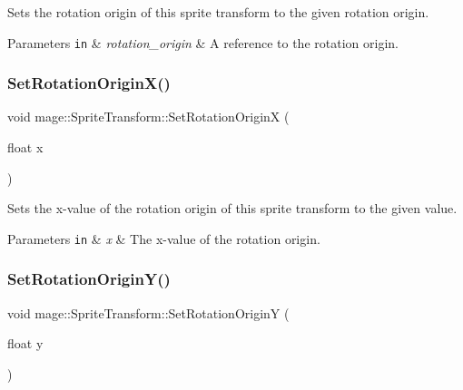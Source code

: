 Sets the rotation origin of this sprite transform to the given rotation origin.


\begin{DoxyParams}[1]{Parameters}
\mbox{\tt in}  & {\em rotation\+\_\+origin} & A reference to the rotation origin. \\
\hline
\end{DoxyParams}
\hypertarget{structmage_1_1_sprite_transform_a8b41bee9010d31027b2c1c40b393a4f5}{}\label{structmage_1_1_sprite_transform_a8b41bee9010d31027b2c1c40b393a4f5} 
\subsubsection{\texorpdfstring{Set\+Rotation\+Origin\+X()}{SetRotationOriginX()}}
{\footnotesize\ttfamily void mage\+::\+Sprite\+Transform\+::\+Set\+Rotation\+OriginX (\begin{DoxyParamCaption}\item[{float}]{x }\end{DoxyParamCaption})}

Sets the x-\/value of the rotation origin of this sprite transform to the given value.


\begin{DoxyParams}[1]{Parameters}
\mbox{\tt in}  & {\em x} & The x-\/value of the rotation origin. \\
\hline
\end{DoxyParams}
\hypertarget{structmage_1_1_sprite_transform_affd054e4f5602930b84a21b1637b657a}{}\label{structmage_1_1_sprite_transform_affd054e4f5602930b84a21b1637b657a} 
\subsubsection{\texorpdfstring{Set\+Rotation\+Origin\+Y()}{SetRotationOriginY()}}
{\footnotesize\ttfamily void mage\+::\+Sprite\+Transform\+::\+Set\+Rotation\+OriginY (\begin{DoxyParamCaption}\item[{float}]{y }\end{DoxyParamCaption})}

